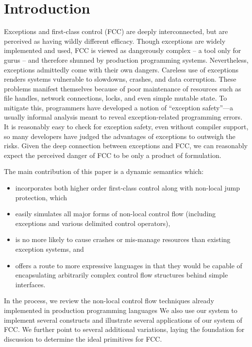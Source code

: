 \documentclass[11pt]{article}
\newcommand{\maybePage}{\newpage}
\begin{document}
\maybePage
\section{Introduction}

Exceptions and first-class control (FCC) are deeply interconnected, but are perceived as having wildly different efficacy.
Though exceptions are widely implemented and used, FCC is viewed as dangerously complex -- a tool only for gurus -- and therefore shunned by production programming systems.
Nevertheless, exceptions admittedly come with their own dangers.
Careless use of exceptions renders systems vulnerable to slowdowns, crashes, and data corruption.
These problems manifest themselves because of poor maintenance of resources such as file handles, network connections, locks, and even simple mutable state.
To mitigate this, programmers have developed a notion of ``exception safety''---a usually informal analysis meant to reveal exception-related programming errors.
It is reasonably easy to check for exception safety, even without compiler support, so many developers have judged the advantages of exceptions to outweigh the risks.
Given the deep connection between exceptions and FCC, we can reasonably expect the perceived danger of FCC to be only a product of formulation.

The main contribution of this paper is a dynamic semantics which:
\begin{itemize}
\item incorporates both higher order first-class control along with non-local jump protection, which
\item easily simulates all major forms of non-local control flow (including exceptions and various delimited control operators),
\item is no more likely to cause crashes or mis-manage resources than existing exception systems, and
\item offers a route to more expressive languages in that they would be capable of encapsulating arbitrarily complex control flow structures behind simple interfaces.
\end{itemize}
In the process, we review the non-local control flow techniques already implemented in production programming languages
We also use our system to implement several constructs and illustrate several applications of our system of FCC.
We further point to several additional variations, laying the foundation for discussion to determine the ideal primitives for FCC.
\end{document}

